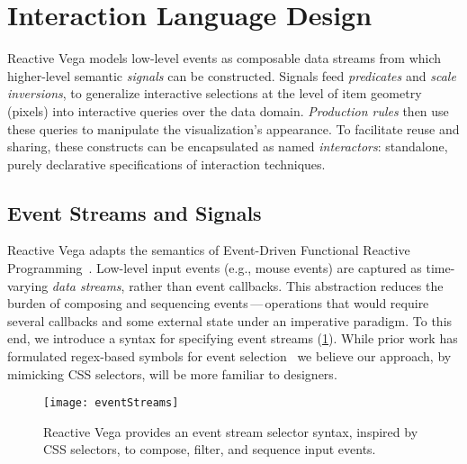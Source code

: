 \section{Interaction Language Design}
\label{sec:vg:primitives}

\vspace{-10pt}

Reactive Vega models low-level events as composable data streams from which
higher-level semantic \emph{signals} can be constructed. Signals feed
\emph{predicates} and \emph{scale inversions}, to generalize interactive
selections at the level of item geometry (pixels) into interactive queries over
the data domain. \emph{Production rules} then use these queries to manipulate
the visualization's appearance. To facilitate reuse and sharing, these
constructs can be encapsulated as named \emph{interactors}: standalone, purely
declarative specifications of interaction techniques.

\vspace{-10pt}

\subsection{Event Streams and Signals}
\label{sec:vg:events}

\vspace{-10pt}

Reactive Vega adapts the semantics of Event-Driven Functional Reactive
Programming~\cite{wan:efrp}. Low-level input events (e.g., mouse events) are
captured as time-varying \emph{data streams}, rather than event callbacks. This
abstraction reduces the burden of composing and sequencing
events\,---\,operations that would require several callbacks and some external
state under an imperative paradigm. To this end, we introduce a syntax for
specifying event streams (\cref{fig:vg:eventStreams}). While prior work has
formulated regex-based symbols for event selection~\cite{kin:proton++} we
believe our approach, by mimicking CSS selectors, will be more familiar to
designers.

\begin{figure}[b!]
  \centering
  \texttt{[image: eventStreams]}
  \caption{Reactive Vega provides an event stream selector syntax, inspired by
  CSS selectors, to compose, filter, and sequence input events.}
  \label{fig:vg:eventStreams}
\end{figure}

